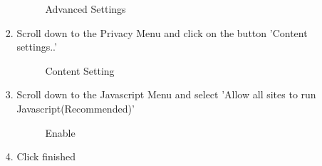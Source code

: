 \documentclass[14pt, a4paper]{article}
\begin{document}
\begin{enumerate}
\begin{enumerate}
\begin{enumerate}
\begin{figure}[H]
		\caption{Advanced Settings}
      \end{figure}
       \item Scroll down to the Privacy Menu and click on the button 'Content settings..'
       \begin{figure}[H]
        \centerline{}
		\caption{Content Setting}
      \end{figure}
       \item Scroll down to the Javascript Menu and select 'Allow all sites to run Javascript(Recommended)'
       \begin{figure}[H]
       \centerline{}
		\caption{Enable}
      \end{figure}
       \item Click finished
     \end{enumerate}


\end{enumerate}
\end{enumerate}
\end{document}
